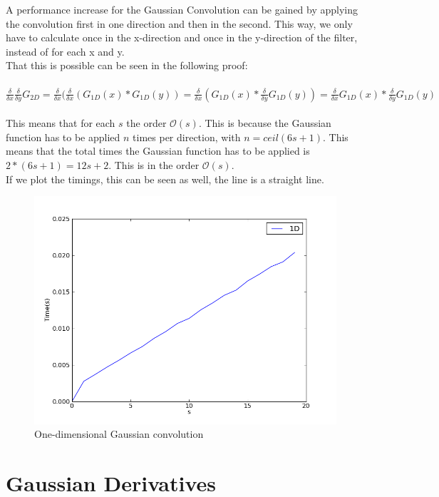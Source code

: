 \documentclass[10pt,a4paper]{article}
\begin{document}
A performance increase for the Gaussian Convolution can be gained by
applying the convolution first in one direction and then in the
second. This way, we only have to calculate once in the x-direction and
once in the y-direction of the filter, instead of for each x and y.\\
That this is possible can be seen in the following proof:\\
\\
$\frac{\delta}{\delta x}\frac{\delta}{\delta y}G_{2D} 
= \frac{\delta}{\delta x}(\frac{\delta}{\delta x}(G_{1D}(x) * G_{1D}(y)) 
= \frac{\delta}{\delta x}(G_{1D}(x) * \frac{\delta}{\delta y}G_{1D}(y))
= \frac{\delta}{\delta x}G_{1D}(x) * \frac{\delta}{\delta y}G_{1D}(y)$\\
\\
This means that for each $s$ the order $\mathcal{O}(s)$. This is because
the Gaussian function has to be applied $n$ times per direction, with
$n = ceil(6s + 1)$. This means that the total times the Gaussian function
has to be applied is $2 * (6s + 1) = 12s + 2$. This is in the order 
$\mathcal{O}(s)$.\\
If we plot the timings, this can be seen as well, the line is a straight
line.
\begin{figure}[H]
	\includegraphics[scale=0.4]{1d.png}
	\caption{One-dimensional Gaussian convolution}
\end{figure}

\section{Gaussian Derivatives}
\end{document}
